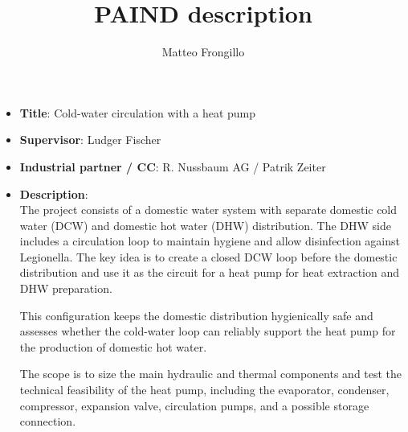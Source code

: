 \documentclass{article}
\title{\textbf{PAIND description}}
\author{Matteo Frongillo}
\date{}
\begin{document}
\maketitle

\begin{itemize}
    \item \textbf{Title}: Cold-water circulation with a heat pump
    \item \textbf{Supervisor}: Ludger Fischer
    \item \textbf{Industrial partner / CC}: R. Nussbaum AG / Patrik Zeiter
    \item \textbf{Description}:\\
    The project consists of a domestic water system with
    separate domestic cold water (DCW) and domestic hot water (DHW)
    distribution. The DHW side includes a circulation loop to
    maintain hygiene and allow disinfection against Legionella.
    The key idea is to create a closed DCW loop before the
    domestic distribution and use it as the circuit for a heat pump
    for heat extraction and DHW preparation.

    This configuration keeps the domestic distribution
    hygienically safe and assesses whether the cold-water loop
    can reliably support the heat pump for the production of
    domestic hot water. 
    
    The scope is to size the main hydraulic and thermal components
    and test the technical feasibility of the heat pump,
    including the evaporator, condenser, compressor, expansion
    valve, circulation pumps, and a possible storage connection.
\end{itemize}
\end{document}
